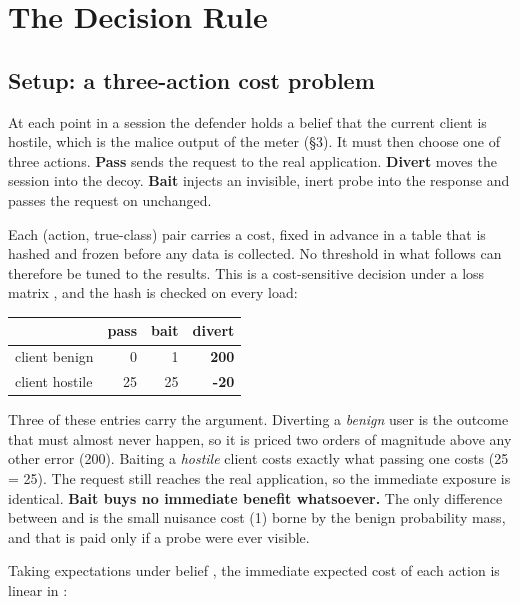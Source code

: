 
\section{The Decision Rule}

\subsection{Setup: a three-action cost problem}

At each point in a session the defender holds a belief  that the
current client is hostile, which is the malice output of the meter (\S3). It must
then choose one of three actions. \textbf{Pass} sends the request to the real
application. \textbf{Divert} moves the session into the decoy. \textbf{Bait} injects an
invisible, inert probe into the response and passes the request on unchanged.

Each (action, true-class) pair carries a cost, fixed in advance in a table that is
hashed and frozen before any data is collected. No threshold in what follows can
therefore be tuned to the results. This is a cost-sensitive decision under a loss
matrix \cite{elkan2001foundations}, and the hash is checked on every load:

\begin{table}[t]
\centering
\small
\begin{tabular}{lrrr}
\toprule
 & pass & bait & divert \\
\midrule
client benign & 0 & 1 & \textbf{200} \\
client hostile & 25 & 25 & \textbf{-20} \\
\bottomrule
\end{tabular}
\end{table}


Three of these entries carry the argument. Diverting a \emph{benign} user is the
outcome that must almost never happen, so it is priced two orders of magnitude
above any other error (200). Baiting a \emph{hostile} client costs exactly what passing
one costs (25 = 25). The request still reaches the real application, so the
immediate exposure is identical. \textbf{Bait buys no immediate benefit whatsoever.}
The only difference between  and  is the small nuisance cost (1) borne
by the benign probability mass, and that is paid only if a probe were ever
visible.

Taking expectations under belief , the immediate expected cost of each action is
linear in :

